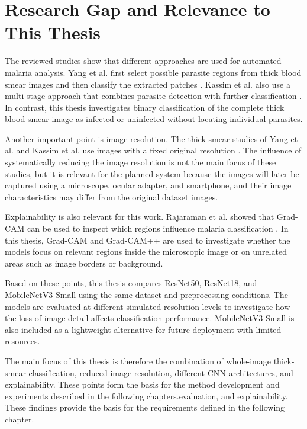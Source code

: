 \section{Research Gap and Relevance to This Thesis}
\label{sec:research_gap}

The reviewed studies show that different approaches are used for automated malaria analysis. Yang et al. first select possible parasite regions from thick blood smear images and then classify the extracted patches \cite{Yang2020}. Kassim et al. also use a multi-stage approach that combines parasite detection with further classification \cite{Kassim2021}. In contrast, this thesis investigates binary classification of the complete thick blood smear image as infected or uninfected without locating individual parasites.

Another important point is image resolution. The thick-smear studies of Yang et al. and Kassim et al. use images with a fixed original resolution \cite{Yang2020,Kassim2021}. The influence of systematically reducing the image resolution is not the main focus of these studies, but it is relevant for the planned system because the images will later be captured using a microscope, ocular adapter, and smartphone, and their image characteristics may differ from the original dataset images.

Explainability is also relevant for this work. Rajaraman et al. showed that Grad-CAM can be used to inspect which regions influence malaria classification \cite{Rajaraman2018Explainability}. In this thesis, Grad-CAM and Grad-CAM++ are used to investigate whether the models focus on relevant regions inside the microscopic image or on unrelated areas such as image borders or background.

Based on these points, this thesis compares ResNet50, ResNet18, and MobileNetV3-Small using the same dataset and preprocessing conditions. The models are evaluated at different simulated resolution levels to investigate how the loss of image detail affects classification performance. MobileNetV3-Small is also included as a lightweight alternative for future deployment with limited resources.

The main focus of this thesis is therefore the combination of whole-image thick-smear classification, reduced image resolution, different CNN architectures, and explainability. These points form the basis for the method development and experiments described in the following chapters.evaluation, and explainability. These findings provide the basis for the requirements defined in the following chapter.